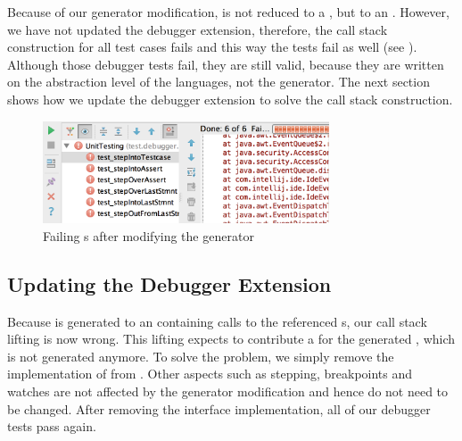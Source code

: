 Because of our generator modification,  is not
reduced to a , but to an . However, we have not
updated the debugger extension, therefore, the call stack construction for all test cases
fails and this way the tests fail as well (see ).
Although those debugger tests fail, they are still valid, because they 
are written on the abstraction level of
the languages, not the generator. The next section shows how we update the
debugger extension to solve the call stack construction.

\begin{figure}[h]
	\vspace{-2mm}
	\centering
    \includegraphics[width=8.5cm]{./figures/failingDebuggerTests.png} 
    \vspace{-3mm}
	\caption{Failing s after modifying the generator}
	\label{fig:TestExecution2}
	\vspace{-2mm}
\end{figure}

\subsection{Updating the Debugger Extension}

Because  is generated to an  containing
calls to the referenced s, our call stack lifting is now wrong.
This lifting expects to contribute a  for the generated
, which is not generated anymore.
To solve the problem, we simply remove the implementation of
 from . Other aspects such as stepping, breakpoints
and watches are not affected by the generator modification and hence do not need
to be changed. After removing the interface implementation, all of our debugger
tests pass again.